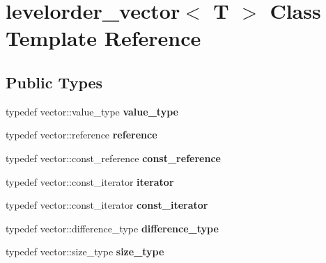 \hypertarget{classlevelorder__vector}{\section{levelorder\+\_\+vector$<$ T $>$ Class Template Reference}
\label{classlevelorder__vector}
}
\subsection*{Public Types}
\begin{DoxyCompactItemize}
\item 
\hypertarget{classlevelorder__vector_a8b4bb6dee5a810a0d328546b68feba12}{typedef vector\+::value\+\_\+type {\bfseries value\+\_\+type}}\label{classlevelorder__vector_a8b4bb6dee5a810a0d328546b68feba12}

\item 
\hypertarget{classlevelorder__vector_a0786df56083511c2feba7a29c418ddc5}{typedef vector\+::reference {\bfseries reference}}\label{classlevelorder__vector_a0786df56083511c2feba7a29c418ddc5}

\item 
\hypertarget{classlevelorder__vector_a87776a7480ed0fa7ff2fcd9c258dc8ad}{typedef vector\+::const\+\_\+reference {\bfseries const\+\_\+reference}}\label{classlevelorder__vector_a87776a7480ed0fa7ff2fcd9c258dc8ad}

\item 
\hypertarget{classlevelorder__vector_a1421e59d3f55cc9e7da10d5399182912}{typedef vector\+::const\+\_\+iterator {\bfseries iterator}}\label{classlevelorder__vector_a1421e59d3f55cc9e7da10d5399182912}

\item 
\hypertarget{classlevelorder__vector_a1f2520e9561b990c74ebccb2ee5fa576}{typedef vector\+::const\+\_\+iterator {\bfseries const\+\_\+iterator}}\label{classlevelorder__vector_a1f2520e9561b990c74ebccb2ee5fa576}

\item 
\hypertarget{classlevelorder__vector_a7362366fdf73647346d8699270ae0a46}{typedef vector\+::difference\+\_\+type {\bfseries difference\+\_\+type}}\label{classlevelorder__vector_a7362366fdf73647346d8699270ae0a46}

\item 
\hypertarget{classlevelorder__vector_a3ed08ee68fdd65c7db5aedf7a9641065}{typedef vector\+::size\+\_\+type {\bfseries size\+\_\+type}}\label{classlevelorder__vector_a3ed08ee68fdd65c7db5aedf7a9641065}

\end{DoxyCompactItemize}
